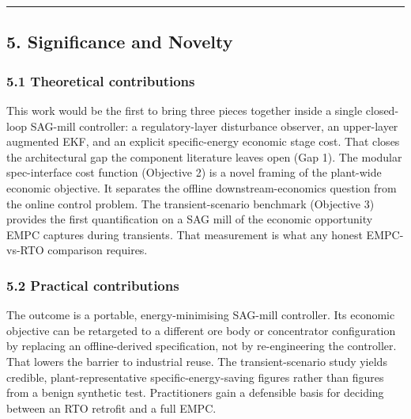 \documentclass[
  14pt,
]{extarticle}
\begin{document}
\begin{center}\rule{0.5\linewidth}{0.5pt}\end{center}

\subsection{5. Significance and Novelty}\label{significance-and-novelty}

\subsubsection{5.1 Theoretical
contributions}\label{theoretical-contributions}

This work would be the first to bring three pieces together inside a
single closed-loop SAG-mill controller: a regulatory-layer disturbance
observer, an upper-layer augmented EKF, and an explicit specific-energy
economic stage cost. That closes the architectural gap the component
literature leaves open (Gap 1). The modular spec-interface cost function
(Objective 2) is a novel framing of the plant-wide economic objective.
It separates the offline downstream-economics question from the online
control problem. The transient-scenario benchmark (Objective 3) provides
the first quantification on a SAG mill of the economic opportunity EMPC
captures during transients. That measurement is what any honest
EMPC-vs-RTO comparison requires.

\subsubsection{5.2 Practical
contributions}\label{practical-contributions}

The outcome is a portable, energy-minimising SAG-mill controller. Its
economic objective can be retargeted to a different ore body or
concentrator configuration by replacing an offline-derived
specification, not by re-engineering the controller. That lowers the
barrier to industrial reuse. The transient-scenario study yields
credible, plant-representative specific-energy-saving figures rather
than figures from a benign synthetic test. Practitioners gain a
defensible basis for deciding between an RTO retrofit and a full EMPC.
\end{document}
